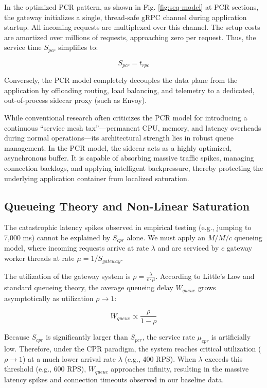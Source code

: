 \documentclass{ieeeaccess}
\begin{document}
In the optimized PCR pattern, as shown in Fig. \ref{fig:seq-model} at PCR sections, the gateway initializes a single, thread-safe gRPC channel during application startup. All incoming requests are multiplexed over this channel. The setup costs are amortized over millions of requests, approaching zero per request. Thus, the service time $S_{pcr}$ simplifies to:

\begin{equation}
    S_{pcr} = t_{rpc}
\end{equation}

Conversely, the PCR model completely decouples the data plane from the application by offloading routing, load balancing, and telemetry to a dedicated, out-of-process sidecar proxy (such as Envoy).

While conventional research often criticizes the PCR model for introducing a continuous ``service mesh tax''—permanent CPU, memory, and latency overheads during normal operations—its architectural strength lies in robust queue management. In the PCR model, the sidecar acts as a highly optimized, asynchronous buffer. It is capable of absorbing massive traffic spikes, managing connection backlogs, and applying intelligent backpressure, thereby protecting the underlying application container from localized saturation.

\subsection{Queueing Theory and Non-Linear Saturation}
\label{sec2.3}

The catastrophic latency spikes observed in empirical testing (e.g., jumping to 7,000 ms) cannot be explained by $S_{cpr}$ alone. We must apply an $M/M/c$ queueing model, where incoming requests arrive at rate $\lambda$ and are serviced by $c$ gateway worker threads at rate $\mu = 1/S_{gateway}$.

The utilization of the gateway system is $\rho = \frac{\lambda}{c \cdot \mu}$.
According to Little's Law \cite{little2011or} and standard queueing theory, the average queueing delay $W_{queue}$ grows asymptotically as utilization $\rho \to 1$:

\begin{equation}
    W_{queue} \propto \frac{\rho}{1 - \rho}
\end{equation}

Because $S_{cpr}$ is significantly larger than $S_{pcr}$, the service rate $\mu_{cpr}$ is artificially low. Therefore, under the CPR paradigm, the system reaches critical utilization ($\rho \to 1$) at a much lower arrival rate $\lambda$ (e.g., 400 RPS). When $\lambda$ exceeds this threshold (e.g., 600 RPS), $W_{queue}$ approaches infinity, resulting in the massive latency spikes and connection timeouts observed in our baseline data.
\end{document}
